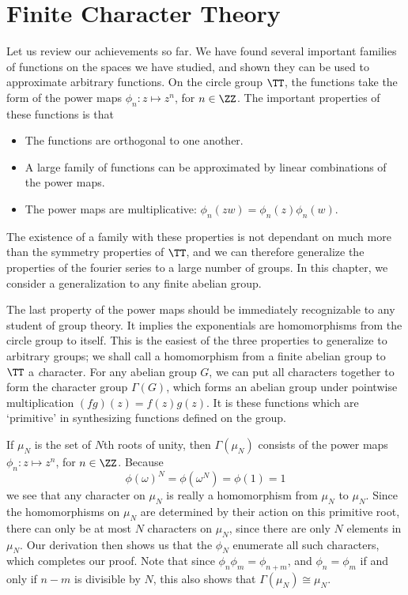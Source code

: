 \chapter{Finite Character Theory}

Let us review our achievements so far. We have found several important families of functions on the spaces we have studied, and shown they can be used to approximate arbitrary functions. On the circle group $\TT$, the functions take the form of the power maps $\phi_n: z \mapsto z^n$, for $n \in \ZZ$. The important properties of these functions is that
%
\begin{itemize}
    \item The functions are orthogonal to one another.
    \item A large family of functions can be approximated by linear combinations of the power maps.
    \item The power maps are multiplicative: $\phi_n(zw) = \phi_n(z) \phi_n(w)$.
\end{itemize}
%
The existence of a family with these properties is not dependant on much more than the symmetry properties of $\TT$, and we can therefore generalize the properties of the fourier series to a large number of groups. In this chapter, we consider a generalization to any finite abelian group.

The last property of the power maps should be immediately recognizable to any student of group theory. It implies the exponentials are homomorphisms from the circle group to itself. This is the easiest of the three properties to generalize to arbitrary groups; we shall call a homomorphism from a finite abelian group to $\TT$ a {\emph character}. For any abelian group $G$, we can put all characters together to form the character group $\Gamma(G)$, which forms an abelian group under pointwise multiplication $(fg)(z) = f(z)g(z)$. It is these functions which are `primitive' in synthesizing functions defined on the group.

\begin{example}
    If $\mu_N$ is the set of $N$th roots of unity, then $\Gamma(\mu_N)$ consists of the power maps $\phi_n: z \mapsto z^n$, for $n \in \ZZ$. Because
    \[ \phi(\omega)^N = \phi(\omega^N) = \phi(1) = 1 \]
    we see that any character on $\mu_N$ is really a homomorphism from $\mu_N$ to $\mu_N$. Since the homomorphisms on $\mu_N$ are determined by their action on this primitive root, there can only be at most $N$ characters on $\mu_N$, since there are only $N$ elements in $\mu_N$. Our derivation then shows us that the $\phi_N$ enumerate all such characters, which completes our proof. Note that since $\phi_n \phi_m = \phi_{n+m}$, and $\phi_n = \phi_m$ if and only if $n - m$ is divisible by $N$, this also shows that $\Gamma(\mu_N) \cong \mu_N$.
\end{example}

